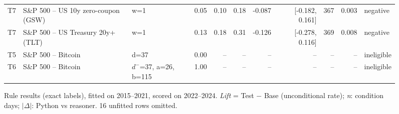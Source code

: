 \begin{figure}[t]
{\begin{tabular}{lllrrrrrrrl}
T7 & S\&P 500 -- US 10y zero-coupon (GSW) & w=1 & 0.05 & 0.10 & 0.18 & -0.087 & [-0.182, 0.161] & 367 & 0.003 & negative \\
T7 & S\&P 500 -- US Treasury 20y+ (TLT) & w=1 & 0.13 & 0.18 & 0.31 & -0.126 & [-0.278, 0.116] & 369 & 0.008 & negative \\
T5 & S\&P 500 -- Bitcoin & d=37 & 0.00 & -- & -- & -- & -- & -- & -- & ineligible \\
T6 & S\&P 500 -- Bitcoin & $d^-$=37, a=26, b=115 & 1.00 & -- & -- & -- & -- & -- & -- & ineligible \\
\bottomrule
\end{tabular}
}
\caption{\small{Rule results (exact labels), fitted on 2015--2021, scored on 2022--2024. \emph{Lift} = Test $-$ Base (unconditional rate); \emph{n}: condition days; $|\Delta|$: Python vs reasoner. 16 unfitted rows omitted.}}
\label{fig:rule-results-pub}
\end{figure}

